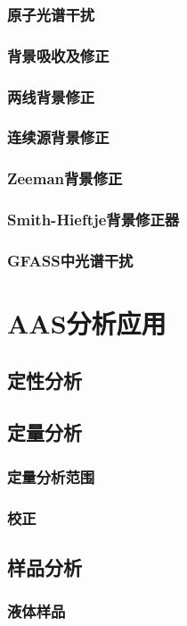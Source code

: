 \subsubsection{原子光谱干扰}
\subsubsection{背景吸收及修正}
\subsubsection{两线背景修正}
\subsubsection{连续源背景修正}
\subsubsection{Zeeman背景修正}
\subsubsection{Smith-Hieftje背景修正器}
\subsubsection{GFASS中光谱干扰}
\section{AAS分析应用}
\subsection{定性分析}
\subsection{定量分析}
\subsubsection{定量分析范围}
\subsubsection{校正}
\subsection{样品分析}
\subsubsection{液体样品}
